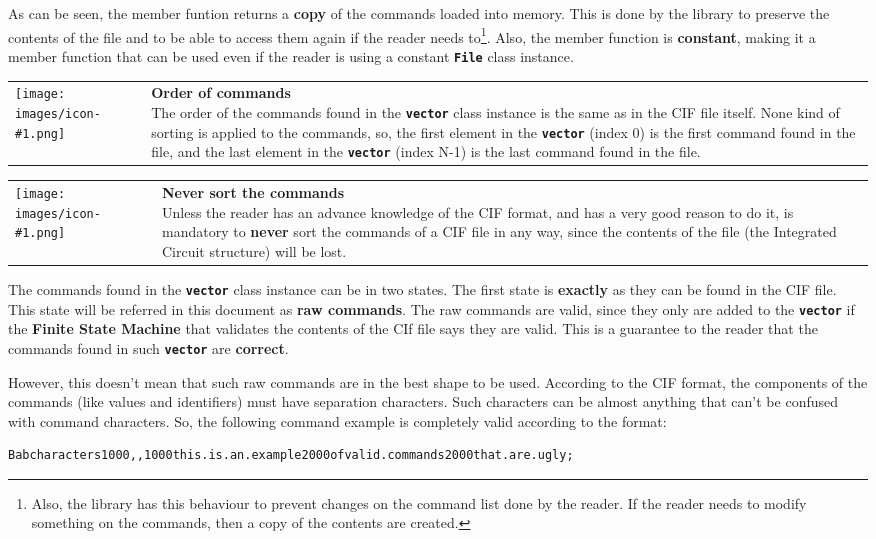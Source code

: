 \documentclass[11pt,twoside,openany,x11names,svgnames]{memoir}
\makeatletter
\newcommand{\IconNote}[3]
{
	\begin{table}[ht]
	\begin{tabular}{ lm{\dimexpr\textwidth-8\tabcolsep-\wd0}@{}}
		\toprule
		\texttt{[image: images/icon-\#1.png]}
		&
		\parbox[t]{155mm}{
		\textbf{#2} \\
		#3
		}
	\end{tabular}
\end{table}
}
\makeatother
\begin{document}
As can be seen, the member funtion returns a \textbf{copy} of the commands loaded into memory. This is done by the library to preserve the contents of the file and to be able to access them again if the reader needs to\footnote{Also, the library has this behaviour to prevent changes on the command list done by the reader. If the reader needs to modify something on the commands, then a copy of the contents are created.}. Also, the member function is \textbf{constant}, making it a member function that can be used even if the reader is using a constant \textbf{\texttt{File}} class instance.

\IconNote
	{info}
	{Order of commands}
	{The order of the commands found in the \textbf{\texttt{vector}} class instance is the same as in the CIF file itself. None kind of sorting is applied to the commands, so, the first element in the \textbf{\texttt{vector}} (index 0) is the first command found in the file, and the last element in the \textbf{\texttt{vector}} (index N-1) is the last command found in the file.}
	
\IconNote
	{error}
	{Never sort the commands}
	{Unless the reader has an advance knowledge of the CIF format, and has a very good reason to do it, is mandatory to \textbf{never} sort the commands of a CIF file in any way, since the contents of the file (the Integrated Circuit structure) will be lost.}
	
The commands found in the \textbf{\texttt{vector}} class instance can be in two states. The first state is \textbf{exactly} as they can be found in the CIF file. This state will be referred in this document as \textbf{raw commands}. The raw commands are valid, since they only are added to the \textbf{\texttt{vector}} if the \textbf{Finite State Machine} that validates the contents of the CIf file says they are valid. This is a guarantee to the reader that the commands found in such \textbf{\texttt{vector}} are \textbf{correct}.

However, this doesn't mean that such raw commands are in the best shape to be used. According to the CIF format, the components of the commands (like values and identifiers) must have separation characters. Such characters can be almost anything that can't be confused with command characters. So, the following command example is completely valid according to the format:

\begin{lstlisting}[frame=single,style=CPPStyle]
Babcharacters1000,,1000this.is.an.example2000ofvalid.commands2000that.are.ugly;
\end{lstlisting}
\end{document}
